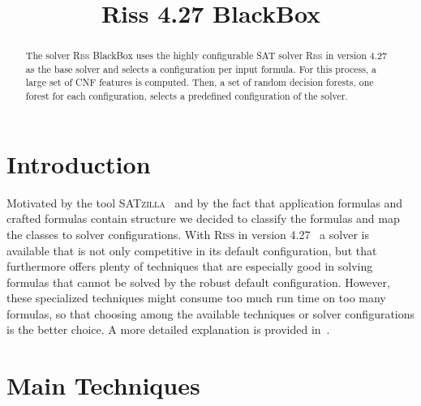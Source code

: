 \documentclass[conference]{IEEEtran}
\begin{document}
	
\title{Riss 4.27 BlackBox}

\author{
}

\maketitle

\def\coprocessor{\textsc{Coprocessor}\xspace}
\def\glucose{\textsc{Glucose~2.2}\xspace}
\def\minisat{\textsc{Minisat~2.2}\xspace}
\def\riss{\textsc{Riss}\xspace}

\begin{abstract}
The solver \textsc{Riss} BlackBox  uses the highly configurable SAT solver \riss in version 4.27 as the base solver and selects a configuration per input formula. 
For this process, a large set of CNF features is computed. 
Then, a set of random decision forests, one forest for each configuration, selects a predefined configuration of the solver. 
\end{abstract}

\section{Introduction}

Motivated by the tool \textsc{SATzilla}~\cite{Xu:2008:SPA:1622673.1622687} and by the fact that application formulas and crafted formulas contain structure we decided to classify the formulas and map the classes to solver configurations. 
With \riss in version 4.27~\cite{riss427} a solver is available that is not only competitive in its default configuration, but that furthermore offers plenty of techniques that are especially good in solving formulas that cannot be solved by the robust default configuration. 
However, these specialized techniques might consume too much run time on too many formulas, so that choosing among the available techniques or solver configurations is the better choice. 
A more detailed explanation is provided in~\cite{blackbox}. 

\section{Main Techniques}
\end{document}

